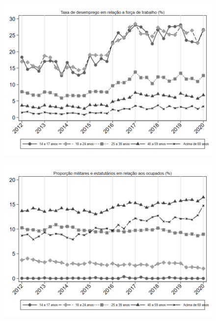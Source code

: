 \begin{frame}[label=_composicao_demografica_faixa_etaria_taxa_de_desemprego]{}
\textit{\hyperlink{_composicao_demografica_faixa_etaria}{}}
\begin{figure}
  \centering
  \includegraphics[width=1.0\linewidth]{../../analysis/output/composicao_demografica/faixa_etaria/_composicao_demografica_faixa_etaria_taxa_de_desemprego.png}
  \caption{}
  \label{fig:_composicao_demografica_faixa_etaria_taxa_de_desemprego}
\end{figure}
\end{frame}

\begin{frame}[label=_composicao_demografica_faixa_etaria_prop_militar]{}
\textit{\hyperlink{_composicao_demografica_faixa_etaria}{}}
\begin{figure}
  \centering
  \includegraphics[width=1.0\linewidth]{../../analysis/output/composicao_demografica/faixa_etaria/_composicao_demografica_faixa_etaria_prop_militar.png}
  \caption{}
  \label{fig:_composicao_demografica_faixa_etaria_prop_militar}
\end{figure}
\end{frame}


